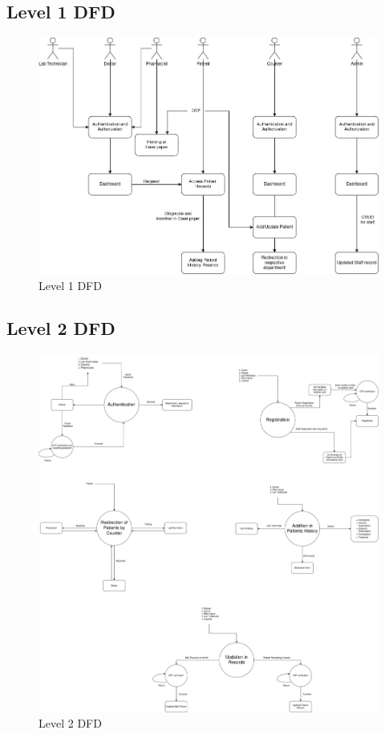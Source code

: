 \subsection{Level 1 DFD}
\begin{figure}[h!]
    \centering
    \includegraphics[width=1.1\textwidth]{level1dfd.jpg}
    \caption{Level 1 DFD}
\end{figure}
\clearpage
\subsection{Level 2 DFD}
\begin{figure}[h!]
    \centering
    \includegraphics[width=1.1\textwidth]{level2dfd.jpg}
    \caption{Level 2 DFD}
\end{figure}
\clearpage
